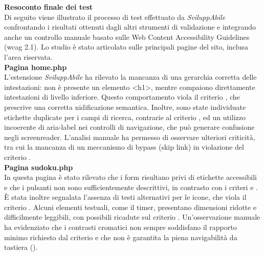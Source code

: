 \vspace{0.8cm}

\noindent \textbf{Resoconto finale dei test}\\
\noindent Di seguito viene illustrato il processo di test effettuato da \textit{SviluppAbile} confrontando i risultati ottenuti dagli altri strumenti di validazione e integrando anche un controllo manuale basato sulle Web Content Accessibility Guidelines (\acrshort{wcag} 2.1). Lo studio è stato articolato sulle principali pagine del sito, inclusa l’area riservata.\\

\noindent \textbf{Pagina home.php}\\
L’estensione \textit{SviluppAbile} ha rilevato la mancanza di una gerarchia corretta delle intestazioni: non è presente un elemento <h1>, mentre compaiono direttamente intestazioni di livello inferiore. Questo comportamento viola il criterio {}, che prescrive una corretta nidificazione semantica. Inoltre, sono state individuate etichette duplicate per i campi di ricerca, contrarie al criterio {}, ed un utilizzo incoerente di aria-label nei controlli di navigazione, che può generare confusione negli screenreader.
L’analisi manuale ha permesso di osservare ulteriori criticità, tra cui la mancanza di un meccanismo di bypass (skip link) in violazione del criterio {}.\\

\noindent \textbf{Pagina sudoku.php}\\
In questa pagina è stato rilevato che i form risultano privi di etichette accessibili e che i pulsanti non sono sufficientemente descrittivi, in contrasto con i criteri {} e {}. È stata inoltre segnalata l’assenza di testi alternativi per le icone, che viola il criterio {}. Alcuni elementi testuali, come il timer, presentano dimensioni ridotte e difficilmente leggibili, con possibili ricadute sul criterio {}.
Un’osservazione manuale ha evidenziato che i contrasti cromatici non sempre soddisfano il rapporto minimo richiesto dal criterio {} e che non è garantita la piena navigabilità da tastiera ({}).\\

